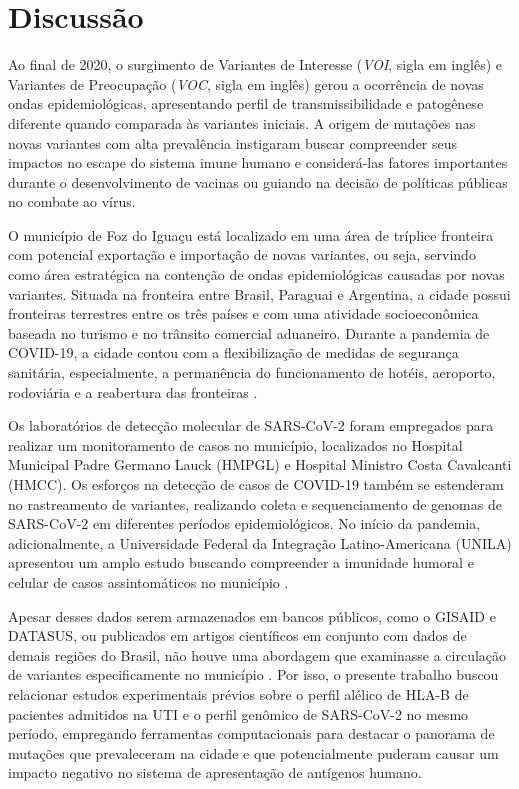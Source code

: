 
\chapter*{Discussão}

\begin{justifying}

Ao final de 2020, o surgimento de Variantes de Interesse (\textit{VOI}, sigla em inglês) e Variantes de Preocupação (\textit{VOC}, sigla em inglês) gerou a ocorrência de novas ondas epidemiológicas, apresentando perfil de transmissibilidade e patogênese diferente quando comparada às variantes iniciais. A origem de mutações nas novas variantes com alta prevalência instigaram buscar compreender seus impactos no escape do sistema imune humano e considerá-las fatores importantes durante o desenvolvimento de vacinas ou guiando na decisão de políticas públicas no combate ao vírus.	

O município  de Foz do Iguaçu está localizado em uma área de tríplice fronteira com potencial exportação e importação de novas variantes, ou seja, servindo como área estratégica na contenção de ondas epidemiológicas causadas por novas variantes. Situada na fronteira entre Brasil, Paraguai e Argentina, a cidade possui fronteiras terrestres entre os três países e com uma atividade socioeconômica baseada no turismo e no trânsito comercial aduaneiro. Durante a pandemia de COVID-19, a cidade contou com a flexibilização de medidas de segurança sanitária, especialmente, a permanência do funcionamento de hotéis, aeroporto, rodoviária e a reabertura das fronteiras \cite{Rivas:2020}. 

Os laboratórios de detecção molecular de SARS-CoV-2 foram empregados para realizar um monitoramento de casos no município, localizados no Hospital Municipal Padre Germano Lauck (HMPGL) e Hospital Ministro Costa Cavalcanti (HMCC). Os esforços na detecção de casos de COVID-19 também se estenderam no rastreamento de variantes, realizando coleta e sequenciamento de genomas de SARS-CoV-2 em diferentes períodos epidemiológicos. No início da pandemia, adicionalmente, a Universidade Federal da Integração Latino-Americana (UNILA) apresentou um amplo estudo buscando compreender a imunidade humoral e celular de casos assintomáticos no município \cite{Viana:2021}. 

Apesar desses dados serem armazenados em bancos públicos, como o GISAID e DATASUS,  ou publicados em artigos científicos em conjunto com dados de demais regiões do Brasil, não houve uma abordagem que examinasse  a circulação de variantes especificamente no município \cite{Giovanetti:2022}. Por isso, o presente trabalho buscou relacionar estudos experimentais prévios sobre o perfil alélico de HLA-B de pacientes admitidos na UTI e o perfil genômico de SARS-CoV-2 no mesmo período, empregando ferramentas computacionais para destacar o panorama de mutações que prevaleceram na cidade e que potencialmente puderam causar um impacto negativo no sistema de apresentação de antígenos humano.


\end{justifying}
